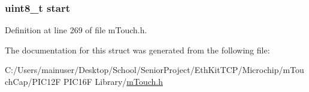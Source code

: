 \subsubsection[{start}]{\setlength{\rightskip}{0pt plus 5cm}uint8\+\_\+t start}\label{structm_touch___most_pressed_index_a7dc2499e4825a78e484bb388ab29dc1d}


Definition at line 269 of file m\+Touch.\+h.



The documentation for this struct was generated from the following file\+:\begin{DoxyCompactItemize}
\item 
C\+:/\+Users/mainuser/\+Desktop/\+School/\+Senior\+Project/\+Eth\+Kit\+T\+C\+P/\+Microchip/m\+Touch\+Cap/\+P\+I\+C12\+F P\+I\+C16\+F Library/\hyperlink{m_touch_cap_2_p_i_c12_f_01_p_i_c16_f_01_library_2m_touch_8h}{m\+Touch.\+h}\end{DoxyCompactItemize}
